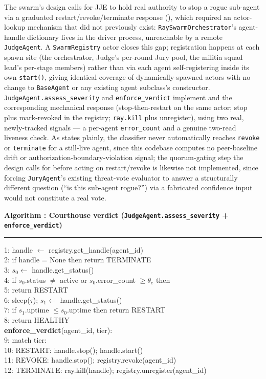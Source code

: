 \documentclass{article}
\newcounter{algo}
\newenvironment{algobox}[1]{%
  \begin{framed}\refstepcounter{algo}\textbf{\sffamily\small Algorithm \thealgo: #1}\vspace{3pt}\hrule\vspace{5pt}
  \small\ttfamily\raggedright
}{%
  \end{framed}
}
\begin{document}
The swarm's design calls for JJE to hold real authority to stop a
rogue sub-agent via a graduated restart/revoke/terminate response
(), which required an actor-lookup mechanism that
did not previously exist: \texttt{RaySwarmOrchestrator}'s agent-handle
dictionary lives in the driver process, unreachable by a remote
\texttt{JudgeAgent}. A \texttt{SwarmRegistry} actor closes this gap;
registration happens at each spawn site (the orchestrator, Judge's
per-round Jury pool, the militia squad lead's per-stage members) rather
than via each agent self-registering inside its own \texttt{start()},
giving identical coverage of dynamically-spawned actors with no change
to \texttt{BaseAgent} or any existing agent subclass's constructor.
\texttt{JudgeAgent.assess\_severity} and \texttt{enforce\_verdict}
implement  and the corresponding mechanical
response (stop-then-restart on the same actor; stop plus mark-revoked
in the registry; \texttt{ray.kill} plus unregister), using two real,
newly-tracked signals --- a per-agent \texttt{error\_count} and a
genuine two-read liveness check. As  states
plainly, the classifier never automatically reaches \texttt{revoke} or
\texttt{terminate} for a still-live agent, since this codebase computes
no peer-baseline drift or authorization-boundary-violation signal; the
quorum-gating step the design calls for before acting on
restart/revoke is likewise not implemented, since forcing
\texttt{JuryAgent}'s existing threat-vote evaluator to answer a
structurally different question (``is this sub-agent rogue?'') via a
fabricated confidence input would not constitute a real vote.

\begin{algobox}{Courthouse verdict (\texttt{JudgeAgent.assess\_severity} + \texttt{enforce\_verdict})}
\label{alg:courthouse}
1: handle $\gets$ registry.get\_handle(agent\_id)\\
2: if handle = None then return TERMINATE\\
3: $s_0 \gets$ handle.get\_status()\\
4: if $s_0$.status $\neq$ active or $s_0$.error\_count $\geq \theta_e$ then\\
5: \quad return RESTART\\
6: sleep($\tau$); $s_1 \gets$ handle.get\_status()\\
7: if $s_1$.uptime $\leq s_0$.uptime then return RESTART\\
8: return HEALTHY\\[6pt]
\textbf{enforce\_verdict}(agent\_id, tier):\\
9: match tier:\\
10: \quad RESTART: handle.stop(); handle.start()\\
11: \quad REVOKE: handle.stop(); registry.revoke(agent\_id)\\
12: \quad TERMINATE: ray.kill(handle); registry.unregister(agent\_id)
\end{algobox}
\end{document}
